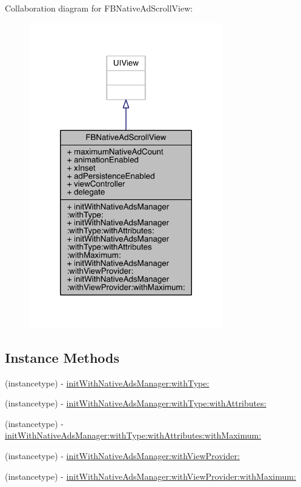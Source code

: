 Collaboration diagram for F\-B\-Native\-Ad\-Scroll\-View\-:
\nopagebreak
\begin{figure}[H]
\begin{center}
\leavevmode
\includegraphics[width=240pt]{interface_f_b_native_ad_scroll_view__coll__graph}
\end{center}
\end{figure}
\subsection*{Instance Methods}
\begin{DoxyCompactItemize}
\item 
(instancetype) -\/ \hyperlink{interface_f_b_native_ad_scroll_view_a7c9ec389c5f0f9f4375e88d813b3e8aa}{init\-With\-Native\-Ads\-Manager\-:with\-Type\-:}
\item 
(instancetype) -\/ \hyperlink{interface_f_b_native_ad_scroll_view_a1a84845198700263a1dd7e3e10164f5f}{init\-With\-Native\-Ads\-Manager\-:with\-Type\-:with\-Attributes\-:}
\item 
(instancetype) -\/ \hyperlink{interface_f_b_native_ad_scroll_view_a5ce36c2a5c86ba6de8902515a9070dba}{init\-With\-Native\-Ads\-Manager\-:with\-Type\-:with\-Attributes\-:with\-Maximum\-:}
\item 
(instancetype) -\/ \hyperlink{interface_f_b_native_ad_scroll_view_a51c05ac76f63e1e5c4d34fa3248a7d81}{init\-With\-Native\-Ads\-Manager\-:with\-View\-Provider\-:}
\item 
(instancetype) -\/ \hyperlink{interface_f_b_native_ad_scroll_view_aed428d2090c9a14f5c7ca40fa52157fb}{init\-With\-Native\-Ads\-Manager\-:with\-View\-Provider\-:with\-Maximum\-:}
\end{DoxyCompactItemize}
